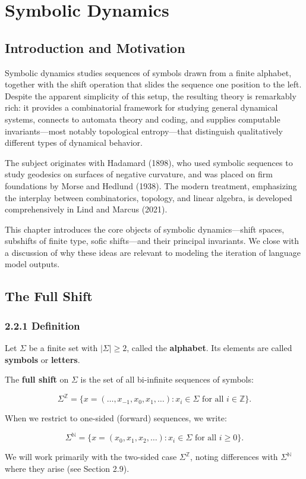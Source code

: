 \chapter{Symbolic Dynamics}

\section{Introduction and Motivation}

Symbolic dynamics studies sequences of symbols drawn from a finite alphabet, together with the shift operation that slides the sequence one position to the left. Despite the apparent simplicity of this setup, the resulting theory is remarkably rich: it provides a combinatorial framework for studying general dynamical systems, connects to automata theory and coding, and supplies computable invariants---most notably topological entropy---that distinguish qualitatively different types of dynamical behavior.

The subject originates with Hadamard (1898), who used symbolic sequences to study geodesics on surfaces of negative curvature, and was placed on firm foundations by Morse and Hedlund (1938). The modern treatment, emphasizing the interplay between combinatorics, topology, and linear algebra, is developed comprehensively in Lind and Marcus (2021).

This chapter introduces the core objects of symbolic dynamics---shift spaces, subshifts of finite type, sofic shifts---and their principal invariants. We close with a discussion of why these ideas are relevant to modeling the iteration of language model outputs.



\section{The Full Shift}

\subsection{2.2.1 Definition}

Let $\Sigma$ be a finite set with $|\Sigma| \geq 2$, called the \textbf{alphabet}. Its elements are called \textbf{symbols} or \textbf{letters}.

\begin{definition}
The \textbf{full shift} on $\Sigma$ is the set of all bi-infinite sequences of symbols:

\[\Sigma^{\mathbb{Z}} = \{ x = (\ldots, x_{-1}, x_0, x_1, \ldots) : x_i \in \Sigma \text{ for all } i \in \mathbb{Z} \} .\]

When we restrict to one-sided (forward) sequences, we write:

\[\Sigma^{\mathbb{N}} = \{ x = (x_0, x_1, x_2, \ldots) : x_i \in \Sigma \text{ for all } i \geq 0 \} .\]

We will work primarily with the two-sided case $\Sigma^{\mathbb{Z}}$, noting differences with $\Sigma^{\mathbb{N}}$ where they arise (see Section 2.9).
\end{definition}

